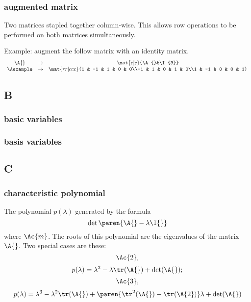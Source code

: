 \subsubsection*{augmented matrix}
Two matrices stapled together column-wise. This allows row operations to be performed on both matrices simultaneously.

Example: augment the follow matrix with an identity matrix.
\begin{equation}
\begin{array}{ccc}
  \A{} & \to & \mat{c|c}{\A{}&\I{3}} \\
  \Aexample & \to & \mat{rr|ccc}{1 & -1 & 1 & 0 & 0\\-1 & 1 & 0 & 1 & 0\\1 & -1 & 0 & 0 & 1}
\end{array}
\end{equation}

\subsection*{B} 

\subsubsection*{basic variables}
\subsubsection*{basis variables}

\subsection*{C} 

\subsubsection*{characteristic polynomial}
The polynomial $p(\lambda)$ generated by the formula
\begin{equation}
  \det \paren{\A{}-\lambda \I{}}
\end{equation}
where $\Ac{m}$. The roots of this polynomial are the eigenvalues of the matrix $\A{}$. Two special cases are these:
\begin{equation*}
  \Ac{2},
\end{equation*}
\begin{equation}
  p(\lambda) = \lambda^{2} -\lambda     \tr (\A{}) + \det(\A{});
\end{equation}
\begin{equation}
  \Ac{3},
\end{equation}
\begin{multline}
  p(\lambda) = \lambda^{3} -\lambda^{2} \tr (\A{}) + \paren{\tr^{2}(\A{})-\tr(\A{2})}\lambda
   + \det(\A{})
\end{multline}
